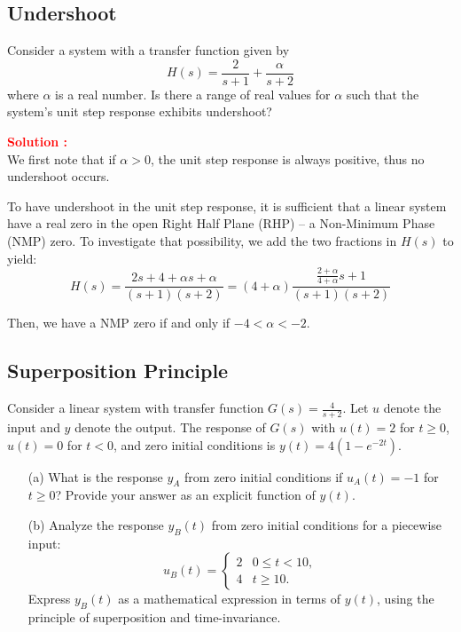 \documentclass[12pt]{article}
\begin{document}
\clearpage

\subsection{Undershoot}

Consider a system with a transfer function given by
\begin{equation}
H(s) = \frac{2}{s + 1} + \frac{\alpha}{s + 2}
\end{equation}
where \(\alpha\) is a real number. Is there a range of real values for \(\alpha\) such that the system's unit step response exhibits undershoot? 


\textbf{\textcolor{red}{Solution :}} \\
We first note that if \(\alpha > 0\), the unit step response is always positive, thus no undershoot occurs. 

To have undershoot in the unit step response, it is sufficient that a linear system have a real zero in the open Right Half Plane (RHP) -- a Non-Minimum Phase (NMP) zero. To investigate that possibility, we add the two fractions in \(H(s)\) to yield:
\begin{equation}
H(s) = \frac{2s + 4 + \alpha s + \alpha}{(s + 1)(s + 2)} = (4+\alpha)\frac{\frac{2 + \alpha}{4 + \alpha}s + 1}{(s + 1)(s + 2)}
\end{equation}

Then, we have a NMP zero if and only if \(-4 < \alpha < -2\).
\clearpage

\subsection{Superposition Principle}

Consider a linear system with transfer function \(G(s) = \frac{4}{s+2}\). Let \(u\) denote the input and \(y\) denote the output. The response of \(G(s)\) with \(u(t) = 2\) for \(t \geq 0\), \(u(t) = 0\) for \(t < 0\), and zero initial conditions is \(y(t) = 4(1 - e^{-2t})\).

\begin{enumerate}
    \item[(a)] What is the response \(y_A\) from zero initial conditions if \(u_A(t) = -1\) for \(t \geq 0\)? Provide your answer as an explicit function of \(y(t)\).
    \item[(b)] Analyze the response \(y_B(t)\) from zero initial conditions for a piecewise input:
    \[ u_B(t) = 
    \begin{cases} 
    2 & 0 \leq t < 10, \\
    4 & t \geq 10.
    \end{cases}
    \]
    Express \(y_B(t)\) as a mathematical expression in terms of \(y(t)\), using the principle of superposition and time-invariance.
\end{enumerate}
\end{document}
